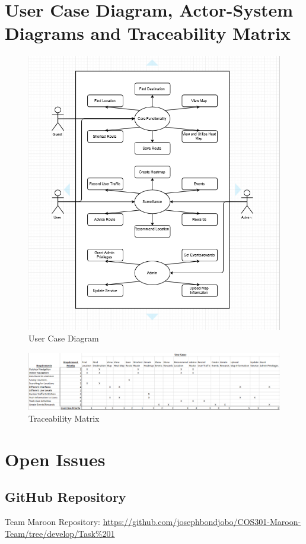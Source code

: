 \documentclass[a4paper,10pt]{article}
\begin{document}
\section{User Case Diagram, Actor-System Diagrams and Traceability Matrix}
\clearpage
		\begin{figure}
		\includegraphics[scale=0.5]{UserCaseDiagram.png}
		\caption{User Case Diagram}
		\end{figure}
		\begin{figure}
		\includegraphics[scale=0.5]{TraceabilityMatrix.png}
		\caption{Traceability Matrix}
		\end{figure}

\clearpage
\section{Open Issues}
\subsection {GitHub Repository}
Team Maroon Repository: \url{https://github.com/josephbondjobo/COS301-Maroon-Team/tree/develop/Task%201}
\end{document}
